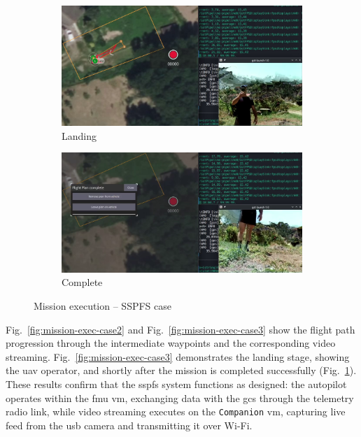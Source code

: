 \begin{figure}[!hbt]
  \begin{subfigure}[t]{0.49\textwidth}
    \centering
    \includegraphics[width=\linewidth]{./img/png/bao-fpv-land-annot} 
    \caption{Landing}%
    \label{fig:mission-exec-case4}
  \end{subfigure}
  \hfill %
  \begin{subfigure}[t]{0.49\textwidth}
    \centering
    \includegraphics[width=\linewidth]{./img/png/bao-fpv-complete-annot} 
    \caption{Complete}%
    \label{fig:mission-exec-case5}
  \end{subfigure}
  
  \caption{Mission execution -- SSPFS case}
  \label{fig:mission-exec-sspfs}
\end{figure}

Fig.~\ref{fig:mission-exec-case2} and Fig.~\ref{fig:mission-exec-case3}
show the flight path progression through the intermediate waypoints and the
corresponding video streaming.
Fig.~\ref{fig:mission-exec-case3} demonstrates the landing stage, showing the
\gls{uav} operator, and shortly after the mission is completed successfully (Fig.~\ref{fig:mission-exec-case4}).
%
These results confirm that the \gls{sspfs} system functions as designed: the
autopilot operates within the \gls{fmu} \gls{vm}, exchanging data with the
\gls{gcs} through the telemetry radio link, while video streaming executes on
the \lstinline{Companion} \gls{vm}, capturing live feed from the \gls{usb} camera and transmitting it over Wi-Fi.


